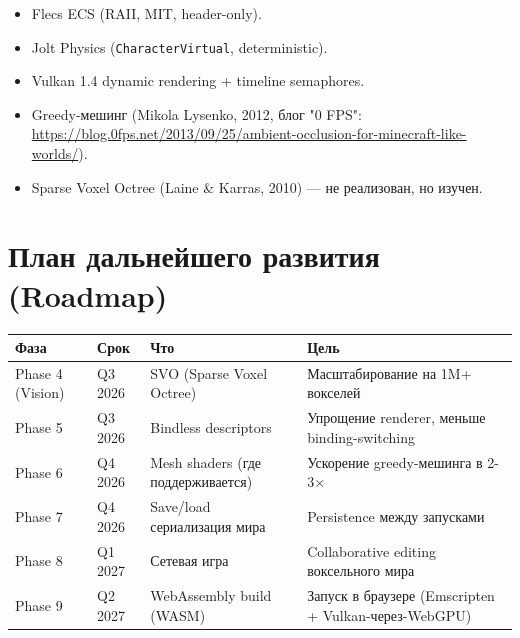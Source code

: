 \begin{itemize}
\tightlist
\item
  Flecs ECS (RAII, MIT, header-only).
\item
  Jolt Physics (\texttt{CharacterVirtual}, deterministic).
\item
  Vulkan 1.4 dynamic rendering + timeline semaphores.
\item
  Greedy-мешинг (Mikola Lysenko, 2012, блог "0 FPS": \url{https://blog.0fps.net/2013/09/25/ambient-occlusion-for-minecraft-like-worlds/}).
\item
  Sparse Voxel Octree (Laine \& Karras, 2010) --- не реализован, но изучен.
\end{itemize}

\section{План дальнейшего развития (Roadmap)}\label{KT-3.2_Final_Report-ux43fux43bux430ux43d-ux434ux430ux43bux44cux43dux435ux439ux448ux435ux433ux43e-ux440ux430ux437ux432ux438ux442ux438ux44f-roadmap}

\begin{longtable}[]{@{}llll@{}}
\toprule\noalign{}
Фаза & Срок & Что & Цель \\
\midrule\noalign{}
\endhead
\bottomrule\noalign{}
\endlastfoot
Phase 4 (Vision) & Q3 2026 & SVO (Sparse Voxel Octree) & Масштабирование на 1M+ вокселей \\
Phase 5 & Q3 2026 & Bindless descriptors & Упрощение renderer, меньше binding-switching \\
Phase 6 & Q4 2026 & Mesh shaders (где поддерживается) & Ускорение greedy-мешинга в 2-3× \\
Phase 7 & Q4 2026 & Save/load сериализация мира & Persistence между запусками \\
Phase 8 & Q1 2027 & Сетевая игра & Collaborative editing воксельного мира \\
Phase 9 & Q2 2027 & WebAssembly build (WASM) & Запуск в браузере (Emscripten + Vulkan-через-WebGPU) \\
\end{longtable}

